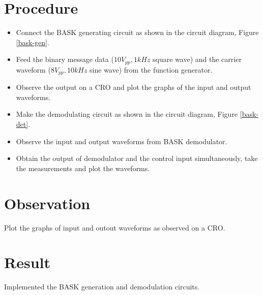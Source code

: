 \section*{Procedure}
\begin{itemize}
\item
Connect the BASK generating circuit as shown in the circuit diagram, Figure \ref{bask-gen}.
\item
Feed the binary message data ($10 V_{pp}, 1 kHz$ square wave) and the carrier waveform  ($8 V_{pp}, 10 kHz$ sine wave) from the function generator.
\item
Observe the output on a CRO and plot the graphs of the input and output waveforms.
\item
Make the demodulating circuit as shown in the circuit diagram, Figure \ref{bask-det}.
\item
Observe the input and output waveforms from BASK demodulator.
\item 
Obtain the output of demodulator and the control input simultaneously, take the measurements and plot the waveforms.

\end{itemize}
\section*{Observation}
Plot the graphs of input and outout waveforms as observed on a CRO.
\section*{Result}

Implemented the BASK generation and demodulation circuits.